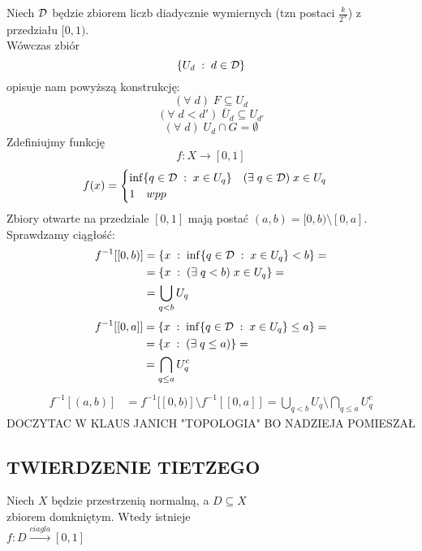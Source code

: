 Niech $\mathcal{D}$ będzie zbiorem liczb diadycznie wymiernych (tzn postaci $\frac k{2^n}$) z przedziału $[0, 1)$. \\Wówczas zbiór
$$\{U_d\;:\;d\in \mathcal{D}\}$$
opisuje nam powyższą konstrukcję:
$$(\forall\;d)\;F\subseteq U_d$$
$$(\forall\;d<d')\;\overline U_d\subseteq U_{d'}$$
$$(\forall\;d)\;U_d\cap G=\emptyset$$
Zdefiniujmy funkcję
$$f:X\to [0,1]$$
$$f(x)=\begin{cases}\inf\{q\in\mathcal{D}\;:\;x\in U_q\}\quad (\exists\;q\in\mathcal{D})\;x\in U_q\\1\quad wpp\end{cases}$$
Zbiory otwarte na przedziale $[0,1]$ mają postać $(a, b)=[0,b)\setminus[0,a]$. Sprawdzamy ciągłość:
\begin{align*}
    f^{-1}[[0,b)] &= \{x\;:\;\inf\{q\in\mathcal{D}\;:\;x\in U_q\}<b\}=\\
                  &=\{x\;:\;(\exists\;q<b)\;x\in U_q\}=\\
                  &=\bigcup\limits_{q<b}U_q
\end{align*}
\begin{align*}
    f^{-1}[[0,a]] &= \{x\;:\;\inf\{q\in\mathcal{D}\;:\;x\in U_q\}\leq a\}=\\
                  &= \{x\;:\;(\exists\;q\leq a)\}=\\
                  &=\bigcap\limits_{q\leq a}U_q^c
\end{align*}
\begin{align*}
    f^{-1}[(a,b)]&=f^{-1}[[0,b)]\setminus f^{-1}[[0, a]] = \bigcup\limits_{q<b}U_q\setminus\bigcap\limits_{q\leq a}U_q^c
\end{align*}
{\large\color{def}DOCZYTAC W KLAUS JANICH "TOPOLOGIA" BO NADZIEJA POMIESZAŁ}

\subsection{TWIERDZENIE TIETZEGO}
\begin{center}\large
    Niech $X$ będzie przestrzenią normalną, a $D\subseteq X$ \\zbiorem domkniętym. Wtedy istnieje\smallskip\\
    $f:D\xrightarrow{ciagla} [0,1]$
\end{center}